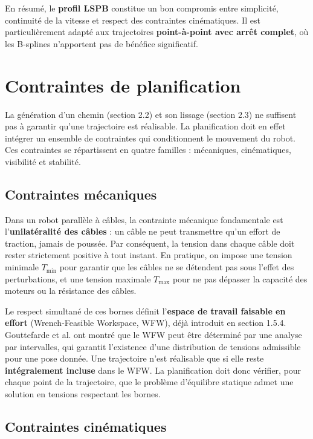 En résumé, le \textbf{profil LSPB} constitue un bon compromis entre simplicité, continuité de la vitesse et respect des contraintes cinématiques. Il est particulièrement adapté aux trajectoires \textbf{point-à-point avec arrêt complet}, où les B-splines n'apportent pas de bénéfice significatif.

\section{Contraintes de planification}

La génération d'un chemin (section 2.2) et son lissage (section 2.3) ne suffisent pas à garantir qu'une trajectoire est réalisable. La planification doit en effet intégrer un ensemble de contraintes qui conditionnent le mouvement du robot. Ces contraintes se répartissent en quatre familles : mécaniques, cinématiques, visibilité et stabilité.

\subsection{Contraintes mécaniques}

Dans un robot parallèle à câbles, la contrainte mécanique fondamentale est l'\textbf{unilatéralité des câbles} : un câble ne peut transmettre qu'un effort de traction, jamais de poussée. Par conséquent, la tension dans chaque câble doit rester strictement positive à tout instant. En pratique, on impose une tension minimale $T_{\min}$ pour garantir que les câbles ne se détendent pas sous l'effet des perturbations, et une tension maximale $T_{\max}$ pour ne pas dépasser la capacité des moteurs ou la résistance des câbles.

Le respect simultané de ces bornes définit l'\textbf{espace de travail faisable en effort} (Wrench-Feasible Workspace, WFW), déjà introduit en section 1.5.4. Gouttefarde et al. \cite{gouttefarde2011} ont montré que le WFW peut être déterminé par une analyse par intervalles, qui garantit l'existence d'une distribution de tensions admissible pour une pose donnée. Une trajectoire n'est réalisable que si elle reste \textbf{intégralement incluse} dans le WFW. La planification doit donc vérifier, pour chaque point de la trajectoire, que le problème d'équilibre statique admet une solution en tensions respectant les bornes.



\subsection{Contraintes cinématiques}

